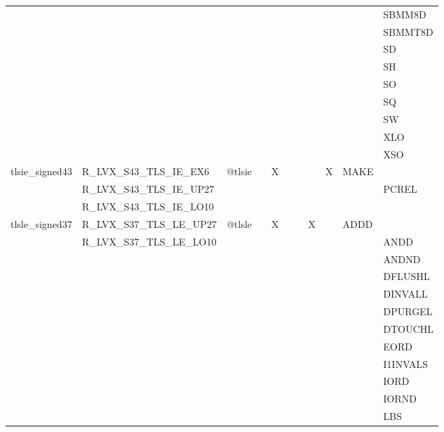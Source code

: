 {\begin{tabular}{|l|l|l|l|l|l|l|l|l|l|l|}
 & & & & & & & & & & \textsf{SBMM8D} \\
 & & & & & & & & & & \textsf{SBMMT8D} \\
 & & & & & & & & & & \textsf{SD} \\
 & & & & & & & & & & \textsf{SH} \\
 & & & & & & & & & & \textsf{SO} \\
 & & & & & & & & & & \textsf{SQ} \\
 & & & & & & & & & & \textsf{SW} \\
 & & & & & & & & & & \textsf{XLO} \\
 & & & & & & & & & & \textsf{XSO} \\
\hline
\textsf{tlsie\_signed43} & \textsf{R\_LVX\_S43\_TLS\_IE\_EX6} & \textsf{@tlsie} & \textsf{} & \textsf{X} & \textsf{} & \textsf{} & \textsf{} & \textsf{X} & \textsf{MAKE} \\
 & \textsf{R\_LVX\_S43\_TLS\_IE\_UP27} & & & & & & & & & \textsf{PCREL} \\
 & \textsf{R\_LVX\_S43\_TLS\_IE\_LO10} & & & & & & & & & \\
\hline
\textsf{tlsle\_signed37} & \textsf{R\_LVX\_S37\_TLS\_LE\_UP27} & \textsf{@tlsle} & \textsf{} & \textsf{X} & \textsf{} & \textsf{} & \textsf{X} & \textsf{} & \textsf{ADDD} \\
 & \textsf{R\_LVX\_S37\_TLS\_LE\_LO10} & & & & & & & & & \textsf{ANDD} \\
 & & & & & & & & & & \textsf{ANDND} \\
 & & & & & & & & & & \textsf{DFLUSHL} \\
 & & & & & & & & & & \textsf{DINVALL} \\
 & & & & & & & & & & \textsf{DPURGEL} \\
 & & & & & & & & & & \textsf{DTOUCHL} \\
 & & & & & & & & & & \textsf{EORD} \\
 & & & & & & & & & & \textsf{I1INVALS} \\
 & & & & & & & & & & \textsf{IORD} \\
 & & & & & & & & & & \textsf{IORND} \\
 & & & & & & & & & & \textsf{LBS} \\
\hline\end{tabular}
}
\smallskip


